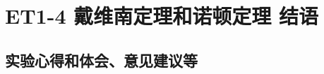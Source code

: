 \documentclass[dvipsnames, svgnames,a4paper,11pt]{article}
\begin{document}
	
	
	
	
	
	
	\clearpage
	
	\section{ET1-4 戴维南定理和诺顿定理 \quad\heiti 结语}
	
	\subsection{实验心得和体会、意见建议等}
\end{document}
